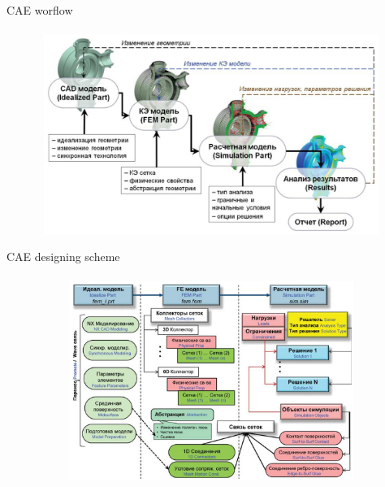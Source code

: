 \documentclass[aspectratio=169]{beamer}
\begin{document}
\begin{frame}[t]{CAE worflow}
\framesubtitle{}
    \vspace{-0.6cm}
    \begin{figure}[H]
        \centering\includegraphics[height=6.5cm,width=1\textwidth,keepaspectratio]{cae_workflow.png}
        \label{fig:cae_workflow.png}
    \end{figure}
\end{frame}

\begin{frame}[t]{CAE designing scheme}
\framesubtitle{}
    \vspace{-0.6cm}
    \begin{figure}[H]
        \centering\includegraphics[height=6.5cm,width=1\textwidth,keepaspectratio]{cae_overview.png}
        \label{fig:cae_overview.png}
    \end{figure}
\end{frame}
\end{document}
